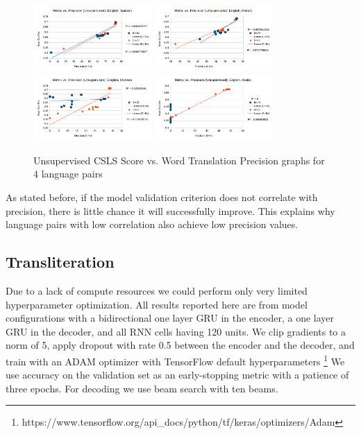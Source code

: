 \documentclass{article}
\begin{document}
\begin{figure}[H]
  \centering
  \includegraphics[width=0.4\textwidth]{spanishCorr}
  \includegraphics[width=0.4\textwidth]{frenchCorr}
  \includegraphics[width=0.4\textwidth]{chineseCorr}
  \includegraphics[width=0.4\textwidth]{arabicCorr}
  \caption{Unsupervised CSLS Score vs. Word Translation Precision graphs for 4 language pairs}
\end{figure}

As stated before, if the model validation criterion does not correlate with
precision, there is little chance it will successfully improve. This
explains why language pairs with low correlation also achieve low precision values.

\subsection*{Transliteration}

Due to a lack of compute resources we could perform
only very limited hyperparameter optimization.
All results reported here are from model configurations
with a bidirectional one layer GRU in the encoder,
a one layer GRU in the decoder,
and all RNN cells having 120 units.
We clip gradients to a norm of 5,
apply dropout with rate 0.5 between the encoder and the decoder,
and train with an ADAM optimizer with TensorFlow default hyperparameters
\footnote{https://www.tensorflow.org/api\_docs/python/tf/keras/optimizers/Adam}
We use accuracy on the validation set as an early-stopping metric
with a patience of three epochs.
For decoding we use beam search with ten beams.
\end{document}

